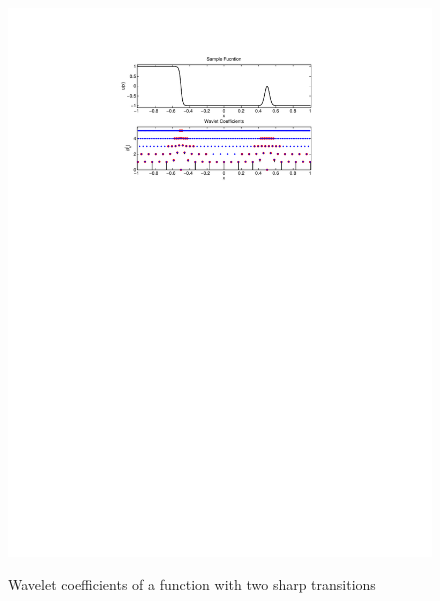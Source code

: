 \begin{figure}[t]
\centering \includegraphics[scale=1]{fig/wlt_decomp.pdf}\\
\caption{Wavelet coefficients of a function with two sharp transitions \cite{th:ScReck} \label{fig:wlt_decomp}}
\end{figure}


